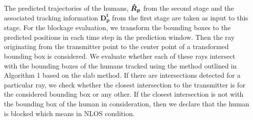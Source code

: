 \documentclass[conference]{IEEEtran}
\begin{document}
The predicted trajectories of the humans, $\bm{\Hat{R}_p}$ from the second stage and the associated tracking information  $\bm{D^t_p}$ from the first stage are taken as input to this stage.  For the blockage evaluation, we transform the bounding boxes to the predicted positions in each time step in the prediction window. Then the ray originating from the transmitter point to the center point of a transformed bounding box is considered. We evaluate whether each of these rays intersect with the bounding boxes of the humans tracked  using the method outlined in Algorithm 1 based on the slab method. If there are intersections detected for a particular ray, we check whether the closest intersection to the transmitter is for the considered bounding box or any other. If the closest intersection is not with the bounding box of the human in consideration, then we declare that the human is blocked which means in NLOS condition.
\end{document}
